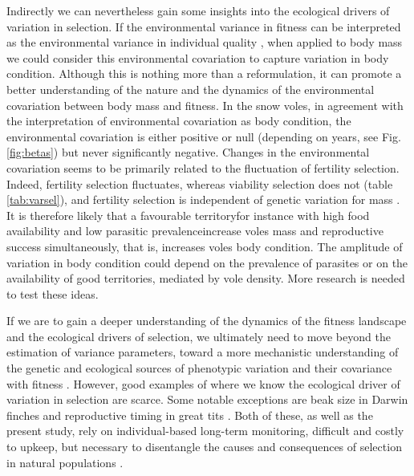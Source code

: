 Indirectly we can nevertheless gain some insights into the ecological drivers of variation in selection. If the environmental variance in fitness can be interpreted as the environmental variance in individual quality \parencite[see][for a discussion of individual quality in an evolutionary context]{Wilson2010a}, when applied to body mass we could consider this environmental covariation to capture variation in body condition. Although this is nothing more than a reformulation, it can promote a better understanding of the nature and the dynamics of the environmental covariation between body mass and fitness. In the snow voles, in agreement with the interpretation of environmental covariation as body condition, the environmental covariation is either positive or null (depending on years, see Fig. \ref{fig:betas}) but never significantly negative.
Changes in the environmental covariation seems to be primarily related to the fluctuation of fertility selection. Indeed, fertility selection fluctuates, whereas viability selection does not (table \ref{tab:varsel}), and fertility selection is independent of genetic variation for mass \parencite{Bonnet2016}.
It is therefore likely that a favourable territory\textemdash for instance with high food availability and low parasitic prevalence\textemdash increase voles mass and reproductive success simultaneously, that is, increases voles body condition. The amplitude of variation in body condition could depend on the prevalence of parasites or on the availability of good territories, mediated by vole density. More research is needed to test these ideas.

If we are to gain a deeper understanding of the dynamics of the fitness landscape and the ecological drivers of selection, we ultimately need to move beyond the estimation of variance parameters, toward a more mechanistic understanding of the genetic and ecological sources of phenotypic variation and their covariance with fitness \parencite{Morrissey2012flusel}. However, good examples of where we know the ecological driver of variation in selection are scarce. Some notable exceptions are beak size in Darwin finches \parencite{Grant2002} and reproductive timing in great tits \parencite{Husby2011}. Both of these, as well as the present study, rely on individual-based long-term monitoring, difficult and costly to upkeep, but necessary to disentangle the causes and consequences of selection in natural populations \parencite{Clutton-brock2010}. 

